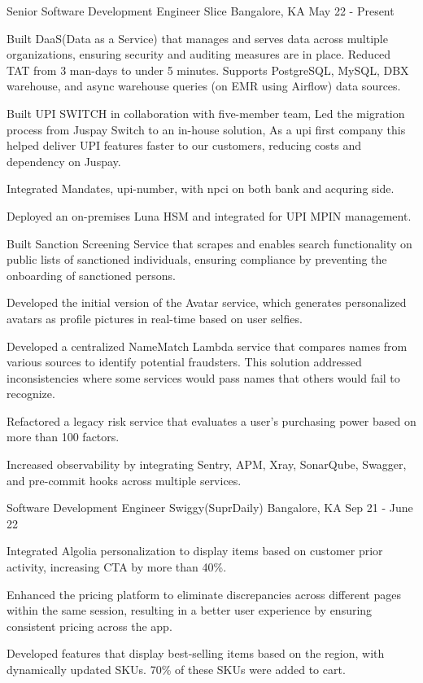 \begin{cventries}
  \cventry
    {Senior Software Development Engineer}
    {Slice}
    {Bangalore, KA}
    {May 22 - Present}
    {
      \begin{cvitems}
        \item {Built DaaS(Data as a Service) that manages and serves data across multiple organizations, ensuring security and auditing measures are in place. Reduced TAT from 3 man-days to under 5 minutes. Supports PostgreSQL, MySQL, DBX warehouse, and async warehouse queries (on EMR using Airflow) data sources.}
        \item {Built UPI SWITCH in collaboration with five-member team, Led the migration process from Juspay Switch to an in-house solution, As a upi first company this helped deliver UPI features faster to our customers, reducing costs and dependency on Juspay.}
        \item {Integrated Mandates, upi-number, with npci on both bank and acquring side.}
        \item {Deployed an on-premises Luna HSM and integrated for UPI MPIN management.}
        \item {Built Sanction Screening Service that scrapes and enables search functionality on public lists of sanctioned individuals, ensuring compliance by preventing the onboarding of sanctioned persons.}
        \item {Developed the initial version of the Avatar service, which generates personalized avatars as profile pictures in real-time based on user selfies.}
        \item {Developed a centralized NameMatch Lambda service that compares names from various sources to identify potential fraudsters. This solution addressed inconsistencies where some services would pass names that others would fail to recognize.}
        \item {Refactored a legacy risk service that evaluates a user's purchasing power based on more than 100 factors.}
        \item {Increased observability by integrating Sentry, APM, Xray, SonarQube, Swagger, and pre-commit hooks across multiple services.}
      \end{cvitems}
    }
  
  \cventry
    {Software Development Engineer}
    {Swiggy(SuprDaily)}
    {Bangalore, KA}
    {Sep 21 - June 22}
    {
      \begin{cvitems}
        \item {Integrated Algolia personalization to display items based on customer prior activity, increasing CTA by more than 40\%.}
        \item {Enhanced the pricing platform to eliminate discrepancies across different pages within the same session, resulting in a better user experience by ensuring consistent pricing across the app.}
        \item {Developed features that display best-selling items based on the region, with dynamically updated SKUs. 70\% of these SKUs were added to cart.}
      \end{cvitems}
    }
  

\end{cventries}
